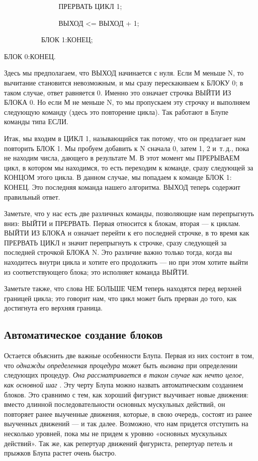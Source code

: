 \documentclass[../main.tex]{subfiles}
\begin{document}
~~~~~~~~~~~~~~~ ПРЕРВАТЬ ЦИКЛ 1;

~~~~~~~~~~~~~~~ ВЫХОД \textless= ВЫХОД + 1;

~~~~~~~~~~ БЛОК 1:КОНЕЦ;

БЛОК 0:КОНЕЦ.

Здесь мы предполагаем, что ВЫХОД начинается с нуля. Если М меньше N, то вычитание становится невозможным, и мы сразу перескакиваем к БЛОКУ 0; в таком случае, ответ равняется 0. Именно это означает строчка ВЫЙТИ ИЗ БЛОКА 0. Но если М не меньше N, то мы пропускаем эту строчку и выполняем следующую команду (здесь это повторение цикла). Так работают в Блупе команды типа ЕСЛИ.

Итак, мы входим в ЦИКЛ 1, называющийся так потому, что он предлагает нам повторить БЛОК 1. Мы пробуем добавить к N сначала 0, затем 1, 2 и~т.\,д., пока не находим числа, дающего в результате М\@. В этот момент мы ПРЕРЫВАЕМ цикл, в котором мы находимся, то есть переходим к команде, сразу следующей за КОНЦОМ этого цикла. В данном случае, мы попадаем к команде БЛОК 1: КОНЕЦ\@. Это последняя команда нашего алгоритма. ВЫХОД теперь содержит правильный ответ.

Заметьте, что у нас есть две различных команды, позволяющие нам перепрыгнуть вниз: ВЫЙТИ и ПРЕРВАТЬ\@. Первая относится к блокам, вторая --- к циклам. ВЫЙТИ ИЗ БЛОКА н означает перейти к его последней строчке, в то время как ПРЕРВАТЬ ЦИКЛ н значит перепрыгнуть к строчке, сразу следующей за последней строчкой БЛОКА N\@. Это различие важно только тогда, когда вы находитесь внутри цикла и хотите его продолжить --- но при этом хотите выйти из соответствующего блока; это исполняет команда ВЫЙТИ.

Заметьте также, что слова НЕ БОЛЬШЕ ЧЕМ теперь находятся перед верхней границей цикла; это говорит нам, что цикл может быть прерван до того, как достигнута его верхняя граница.


\subsection{Автоматическое создание блоков}

Остается объяснить две важные особенности Блупа. Первая из них состоит в том, что \emph{однажды определенная процедура} может быть \emph{вызвана} при определении следующих процедур. \emph{Она рассматривается в таком случае как нечто целое, как основной шаг} . Эту черту Блупа можно назвать автоматическим созданием блоков. Это сравнимо с тем, как хороший фигурист выучивает новые движения: вместо длинной последовательности основных мускульных действий, он повторяет ранее выученные движения, которые, в свою очередь, состоят из ранее выученных движений --- и так далее. Возможно, что нам придется отступить на несколько уровней, пока мы не придем к уровню «основных мускульных действий». Так же, как репертуар движений фигуриста, репертуар петель и прыжков Блупа растет очень быстро.
\end{document}
